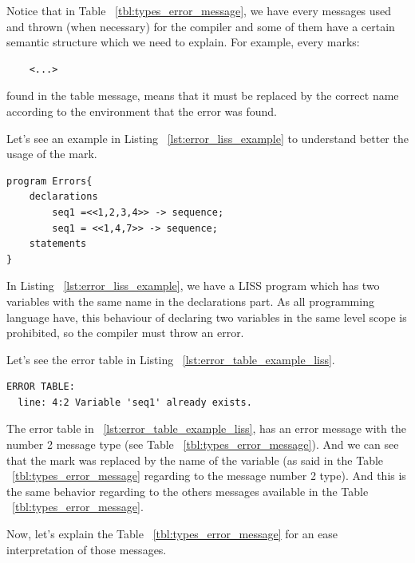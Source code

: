 \documentclass[
  oneside,
  11pt, a4paper,
  footinclude=true,
  headinclude=true,
  cleardoublepage=empty
]{scrbook}
\begin{document}
Notice that in Table ~\ref{tbl:types_error_message}, we have every messages used and thrown (when necessary) for the compiler and some of them have a certain semantic structure which we need to explain.
For example, every marks:
\begin{lstlisting}
	<...>
\end{lstlisting}
found in the table message, means that it must be replaced by the correct name according to the environment that the error was found.

Let's see an example in Listing ~\ref{lst:error_liss_example} to understand better the usage of the mark.
\begin{lstlisting}[label={lst:error_liss_example},caption={Partial Listing}]
program Errors{
	declarations
		seq1 =<<1,2,3,4>> -> sequence;
		seq1 = <<1,4,7>> -> sequence;
	statements
}
\end{lstlisting}

In Listing ~\ref{lst:error_liss_example}, we have a LISS program which has two variables with the same name in the declarations part. As all programming language have, this behaviour of declaring two variables in the same level scope is prohibited, so the compiler must throw an error.

Let's see the error table in Listing ~\ref{lst:error_table_example_liss}.

\begin{lstlisting}[label={lst:error_table_example_liss},caption={Error table related to Listing ~\ref{lst:error_liss_example}}]
  ERROR TABLE:
  line: 4:2	Variable 'seq1' already exists.
\end{lstlisting}

The error table in ~\ref{lst:error_table_example_liss}, has an error message with the number 2 message type (see Table ~\ref{tbl:types_error_message}).
And we can see that the mark was replaced by the name of the variable (as said in the Table ~\ref{tbl:types_error_message} regarding to the message number 2 type).
And this is the same behavior regarding to the others messages available in the Table ~\ref{tbl:types_error_message}.

Now, let's explain the Table ~\ref{tbl:types_error_message} for an ease interpretation of those messages.
\end{document}
